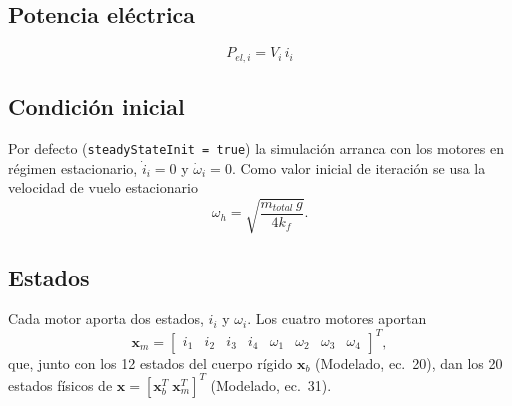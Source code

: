 \subsection{Potencia eléctrica}
\begin{equation}
  P_{el,i} = V_i\, i_i
\end{equation}

\subsection{Condición inicial}
Por defecto (\texttt{steadyStateInit = true}) la simulación arranca con los motores en
régimen estacionario, $\dot i_i = 0$ y $\dot\omega_i = 0$. Como valor inicial de
iteración se usa la velocidad de vuelo estacionario
\begin{equation}
  \omega_h = \sqrt{\frac{m_{total}\, g}{4 k_f}} .
\end{equation}

\subsection{Estados}
Cada motor aporta dos estados, $i_i$ y $\omega_i$. Los cuatro motores aportan
\begin{equation}
  \mathbf{x}_m = \begin{bmatrix} i_1 & i_2 & i_3 & i_4 & \omega_1 & \omega_2 & \omega_3 & \omega_4 \end{bmatrix}^T ,
\end{equation}
que, junto con los 12 estados del cuerpo rígido $\mathbf{x}_b$ (Modelado, ec.~20),
dan los 20 estados físicos de $\mathbf{x} = [\mathbf{x}_b^T\;\mathbf{x}_m^T]^T$
(Modelado, ec.~31).
